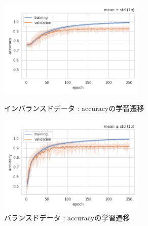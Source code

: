 \documentclass[a4j, 11pt]{jreport}
\begin{document}
\begin{figure}[htbp]
  \begin{minipage}[b]{0.45\hsize}
    \centering
    \includegraphics[keepaspectratio, width=7cm]{images/accs_ex4-2.png}
    \caption{インバランスドデータ : accuracyの学習遷移}
		\label{fig:accs_ex4-2-2}
  \end{minipage}
  \begin{minipage}[b]{0.45\hsize}
    \centering
    \includegraphics[keepaspectratio, width=7cm]{images/accs_ex4-3.png}
    \caption{バランスドデータ : accuracyの学習遷移}
		\label{fig:accs_ex4-3}
  \end{minipage}
\end{figure}

\newpage
\end{document}
